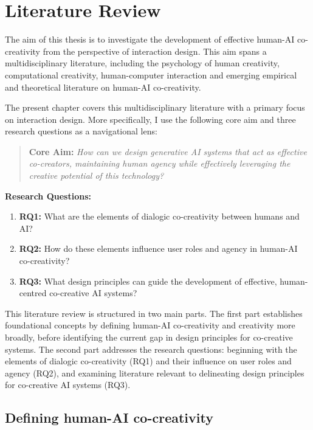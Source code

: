 \chapter[Literature Review]{Literature Review}

The aim of this thesis is to investigate the development of effective human-AI co-creativity from the perspective of interaction design. This aim spans a multidisciplinary literature, including the psychology of human creativity, computational creativity, human-computer interaction and emerging empirical and theoretical literature on human-AI co-creativity. 

The present chapter covers this multidisciplinary literature with a primary focus on interaction design. More specifically, I use the following core aim and three research questions as a navigational lens:

\begin{quote}
\textbf{Core Aim:}
\emph{How can we design generative AI systems that act as effective co-creators, maintaining human agency while effectively leveraging the creative potential of this technology?}
\end{quote}

\textbf{Research Questions:}
\begin{enumerate}
    \item \textbf{RQ1:} What are the elements of dialogic co-creativity between humans and AI?
    \item \textbf{RQ2:} How do these elements influence user roles and agency in human-AI co-creativity?
    \item \textbf{RQ3:} What design principles can guide the development of effective, human-centred co-creative AI systems?
\end{enumerate}

This literature review is structured in two main parts. The first part establishes foundational concepts by defining human-AI co-creativity and creativity more broadly, before identifying the current gap in design principles for co-creative systems. The second part addresses the research questions: beginning with the elements of dialogic co-creativity (RQ1) and their influence on user roles and agency (RQ2), and examining literature relevant to delineating design principles for co-creative AI systems (RQ3).

\section{Defining human-AI co-creativity}


